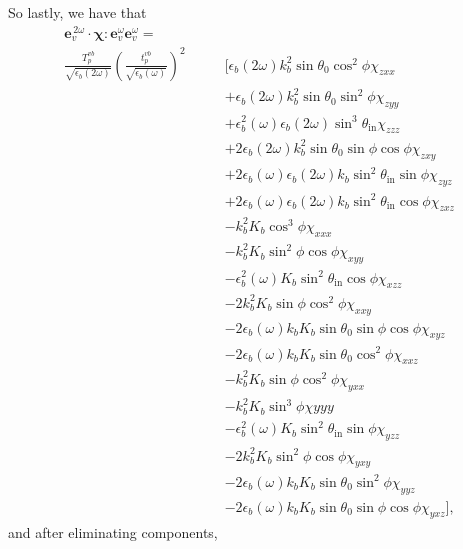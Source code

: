 So lastly, we have that
\begin{equation*}
\begin{split}
\mathbf{e}^{\,2\omega}_{v}\cdot
\boldsymbol{\chi}:\mathbf{e}^{\omega}_{v}\mathbf{e}^{\omega}_{v}
=\qquad\qquad&\\
\frac{T^{v b}_{p}}{\sqrt{\epsilon_{b}(2\omega)}}
\left(\frac{t^{v b}_{p}}{\sqrt{\epsilon_{b}(\omega)}}\right)^{2}
&\big[
    \epsilon_{b}(2\omega)k^{2}_{b}
    \sin\theta_{0}\cos^{2}\phi\chi_{zxx}\\
&+  \epsilon_{b}(2\omega)k^{2}_{b}
    \sin\theta_{0}\sin^{2}\phi\chi_{zyy}\\
&+  \epsilon^{2}_{b}(\omega)\epsilon_{b}(2\omega)
    \sin^{3}\theta_{\mathrm{in}}\chi_{zzz}\\
&+ 2\epsilon_{b}(2\omega)k^{2}_{b}\sin\theta_{0}
    \sin\phi\cos\phi\chi_{zxy}\\
&+ 2\epsilon_{b}(\omega)\epsilon_{b}(2\omega)k_{b}
    \sin^{2}\theta_{\mathrm{in}}\sin\phi\chi_{zyz}\\
&+ 2\epsilon_{b}(\omega)\epsilon_{b}(2\omega)k_{b}
    \sin^{2}\theta_{\mathrm{in}}\cos\phi\chi_{zxz}\\
&-  k^{2}_{b}K_{b}\cos^{3}\phi\chi_{xxx}\\
&-  k^{2}_{b}K_{b}\sin^{2}\phi\cos\phi\chi_{xyy}\\
&-  \epsilon^{2}_{b}(\omega)K_{b}
    \sin^{2}\theta_{\mathrm{in}}\cos\phi\chi_{xzz}\\
&- 2k^{2}_{b}K_{b}\sin\phi\cos^{2}\phi\chi_{xxy}\\
&- 2\epsilon_{b}(\omega)k_{b}K_{b}
    \sin\theta_{0}\sin\phi\cos\phi\chi_{xyz}\\
&- 2\epsilon_{b}(\omega)k_{b}K_{b}
    \sin\theta_{0}\cos^{2}\phi\chi_{xxz}\\
&-  k^{2}_{b}K_{b}\sin\phi\cos^{2}\phi\chi_{yxx}\\
&-  k^{2}_{b}K_{b}\sin^{3}\phi\chi{yyy}\\
&-  \epsilon^{2}_{b}(\omega)K_{b}
    \sin^{2}\theta_{\mathrm{in}}\sin\phi\chi_{yzz}\\
&- 2k^{2}_{b}K_{b}\sin^{2}\phi\cos\phi\chi_{yxy}\\
&- 2\epsilon_{b}(\omega)k_{b}K_{b}
    \sin\theta_{0}\sin^{2}\phi\chi_{yyz}\\
&- 2\epsilon_{b}(\omega)k_{b}K_{b}
    \sin\theta_{0}\sin\phi\cos\phi\chi_{yxz}
\big],
\end{split}
\end{equation*}
and after eliminating components,
